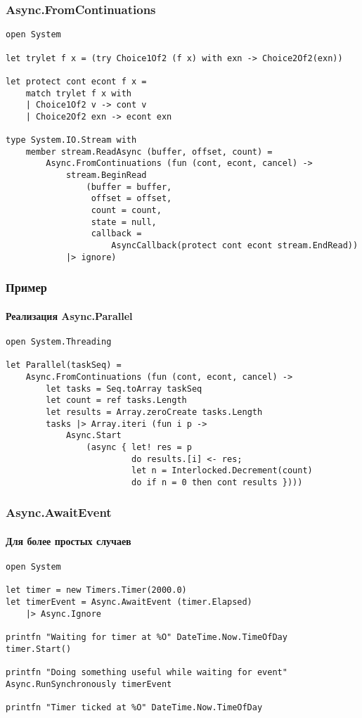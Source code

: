 \documentclass[xetex,mathserif,serif]{beamer}
\begin{document}
	\begin{frame}[fragile]
		\frametitle{Async.FromContinuations}
		\begin{scriptsize}
			\begin{verbatim}
open System

let trylet f x = (try Choice1Of2 (f x) with exn -> Choice2Of2(exn))

let protect cont econt f x =
    match trylet f x with
    | Choice1Of2 v -> cont v
    | Choice2Of2 exn -> econt exn

type System.IO.Stream with
    member stream.ReadAsync (buffer, offset, count) =
        Async.FromContinuations (fun (cont, econt, cancel) ->
            stream.BeginRead
                (buffer = buffer,
                 offset = offset,
                 count = count,
                 state = null,
                 callback = 
                     AsyncCallback(protect cont econt stream.EndRead))
            |> ignore)
			\end{verbatim}
		\end{scriptsize}
	\end{frame}

	\begin{frame}[fragile]
		\frametitle{Пример}
		\framesubtitle{Реализация Async.Parallel}
		\begin{verbatim}
open System.Threading

let Parallel(taskSeq) =
    Async.FromContinuations (fun (cont, econt, cancel) ->
        let tasks = Seq.toArray taskSeq
        let count = ref tasks.Length
        let results = Array.zeroCreate tasks.Length
        tasks |> Array.iteri (fun i p ->
            Async.Start
                (async { let! res = p
                         do results.[i] <- res;
                         let n = Interlocked.Decrement(count)
                         do if n = 0 then cont results })))
		\end{verbatim}
	\end{frame}

	\begin{frame}[fragile]
		\frametitle{Async.AwaitEvent}
		\framesubtitle{Для более простых случаев}
		\begin{verbatim}
open System

let timer = new Timers.Timer(2000.0)
let timerEvent = Async.AwaitEvent (timer.Elapsed) 
    |> Async.Ignore

printfn "Waiting for timer at %O" DateTime.Now.TimeOfDay
timer.Start()

printfn "Doing something useful while waiting for event"
Async.RunSynchronously timerEvent

printfn "Timer ticked at %O" DateTime.Now.TimeOfDay
		\end{verbatim}
	\end{frame}
\end{document}
